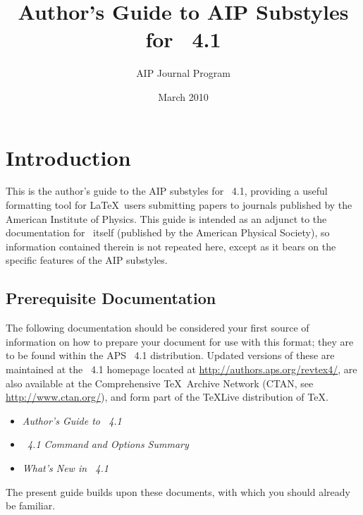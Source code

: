 \documentclass[%
 reprint,%
 amssymb, amsmath,%
 aip,cha,%
]{revtex4-1}
\begin{document}
\title{Author's Guide to AIP Substyles for \revtex~4.1}%

\author{AIP Journal Program}%
%

\date{March 2010}%
%

\maketitle

\tableofcontents

\section{Introduction}

This is the author's guide to the AIP substyles for \revtex~4.1, 
providing a useful formatting tool 
for \LaTeX\ users submitting papers to journals 
published by the American Institute of Physics.
This guide is intended as an adjunct to the documentation for \revtex\ itself 
(published by the American Physical Society), 
so information contained therein is not repeated here, 
except as it bears on the specific features of the AIP substyles.


\subsection{Prerequisite Documentation}

The following documentation should be considered your first source of information 
on how to prepare your document for use with this format; 
they are to be found within the APS \revtex~4.1 distribution. 
Updated versions of these are maintained at
the \revtex~4.1 homepage located at \url{http://authors.aps.org/revtex4/},
are also available at the Comprehensive \TeX\ Archive Network (CTAN, see \url{http://www.ctan.org/}), 
and form part of the \TeX Live distribution of \TeX.
\begin{itemize}
\item \textit{Author's Guide to \revtex~4.1}
\item \textit{\revtex~4.1 Command and Options Summary}
\item \textit{What's New in \revtex~4.1}
\end{itemize}
The present guide builds upon these documents, with which you should already be familiar.
\end{document}
